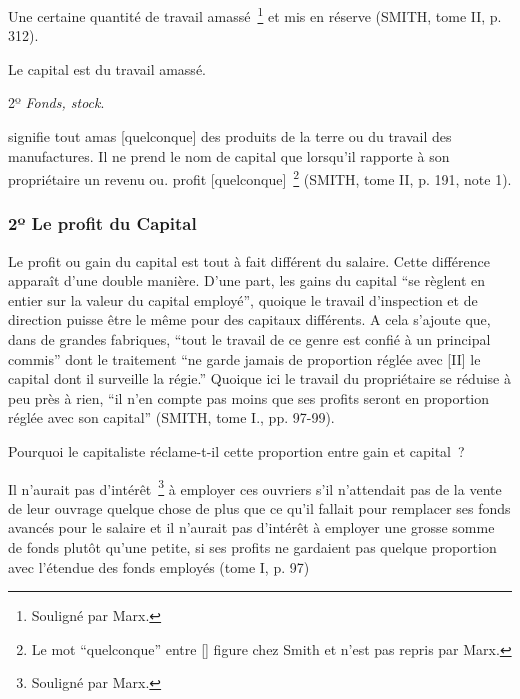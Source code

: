 \documentclass[french,twoside]{book} %
\newenvironment{quoteblock}%
  {\begin{quoting}}
  {\end{quoting}}
\newenvironment{quotebar}{%
    \def\FrameCommand{{\color{rubric!10!}\vrule width 0.5em} \hspace{0.9em}}%
    \def\OuterFrameSep{\itemsep} %
    \MakeFramed {\advance\hsize-\width \FrameRestore}
  }%
  {%
    \endMakeFramed
  }
\renewenvironment{quoteblock}%
  {%
    \savenotes
    \setstretch{0.9}
    \normalfont
    \begin{quotebar}
  }
  {%
    \end{quotebar}
    \spewnotes
  }
\begin{document}
\begin{quoteblock}
 \noindent Une certaine quantité de travail amassé \footnote{Souligné par Marx.} et mis en réserve (SMITH, tome II, p. 312).
 \end{quoteblock}

\noindent Le capital est du travail amassé.\par
2º \emph{Fonds, stock}.\par

\begin{quoteblock}
 \noindent signifie tout amas [quelconque] des produits de la terre ou du travail des manufactures. Il ne prend le nom de capital que lorsqu’il rapporte à son propriétaire un revenu ou. profit [quelconque] \footnote{Le mot “quelconque” entre [] figure chez Smith et n’est pas repris par Marx.} (SMITH, tome II, p. 191, note 1).
 \end{quoteblock}

\subsubsection[{2º Le profit du Capital}]{2º Le profit du Capital}

\begin{quoteblock}
 \noindent Le profit ou gain du capital est tout à fait différent du salaire. Cette différence apparaît d’une double manière. D’une part, les gains du capital “se règlent en entier sur la valeur du capital employé”, quoique le travail d’inspection et de direction puisse être le même pour des capitaux différents. A cela s’ajoute que, dans de grandes fabriques, “tout le travail de ce genre est confié à un principal commis” dont le traitement “ne garde jamais de proportion réglée avec [II] le capital dont il surveille la régie.” Quoique ici le travail du propriétaire se réduise à peu près à rien, “il n’en compte pas moins que ses profits seront en proportion réglée avec son capital” (SMITH, tome I., pp. 97-99).
 \end{quoteblock}

\noindent Pourquoi le capitaliste réclame-t-il cette proportion entre gain et capital ?\par

\begin{quoteblock}
 \noindent Il n’aurait pas d’intérêt \footnote{Souligné par Marx.} à employer ces ouvriers s’il n’attendait pas de la vente de leur ouvrage quelque chose de plus que ce qu’il fallait pour remplacer ses fonds avancés pour le salaire et il n’aurait pas d’intérêt à employer une grosse somme de fonds plutôt qu’une petite, si ses profits ne gardaient pas quelque proportion avec l’étendue des fonds employés (tome I, p. 97)
 \end{quoteblock}
\end{document}
